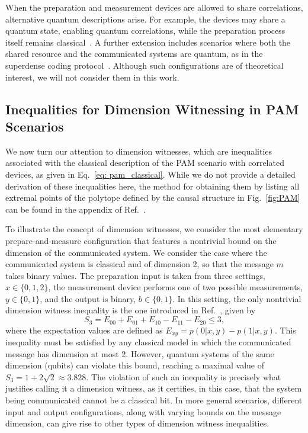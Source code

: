 \documentclass[aps,pra,reprint, superscriptaddress,showkeys]{revtex4-2}
\theoremstyle{plain}
\begin{document}
When the preparation and measurement devices are allowed to share correlations, alternative quantum descriptions arise. For example, the devices may share a quantum state, enabling quantum correlations, while the preparation process itself remains classical~\cite{pawlowski2010}. A further extension includes scenarios where both the shared resource and the communicated systems are quantum, as in the superdense coding protocol~\cite{bennett92}. Although such configurations are of theoretical interest, we will not consider them in this work.

\subsection{Inequalities for Dimension Witnessing in PAM Scenarios}
We now turn our attention to dimension witnesses, which are inequalities associated with the classical description of the PAM scenario with correlated devices, as given in Eq.~\eqref{eq: pam_classical}. While we do not provide a detailed derivation of these inequalities here, the method for obtaining them by listing all extremal points of the polytope defined by the causal structure in Fig.~\ref{fig:PAM} can be found in the appendix of Ref.~\cite{davide2020}.

To illustrate the concept of dimension witnesses, we consider the most elementary prepare-and-measure configuration that features a nontrivial bound on the dimension of the communicated system. We consider the case where the communicated system is classical and of dimension 2, so that the message \(m\) takes binary values. The preparation input is taken from three settings, \(x \in \{0,1,2\}\), the measurement device performs one of two possible measurements, \(y \in \{0,1\}\), and the output is binary, \(b \in \{0,1\}\). In this setting, the only nontrivial dimension witness inequality is the one introduced in Ref.~\cite{gallego2010}, given by
\begin{equation}
    S_3 = E_{00} + E_{01} + E_{10} - E_{11} - E_{20} \leq 3,
    \label{eq: pam_s3}
\end{equation}
where the expectation values are defined as \(E_{xy} = p(0|x,y) - p(1|x,y)\). This inequality must be satisfied by any classical model in which the communicated message has dimension at most 2. However, quantum systems of the same dimension (qubits) can violate this bound, reaching a maximal value of \(S_3 = 1 + 2\sqrt{2} \approx 3.828\). The violation of such an inequality is precisely what justifies calling it a dimension witness, as it certifies, in this case, that the system being communicated cannot be a classical bit. In more general scenarios, different input and output configurations, along with varying bounds on the message dimension, can give rise to other types of dimension witness inequalities.
\end{document}
